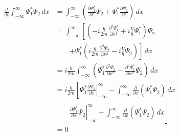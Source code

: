 \documentclass{article}
\begin{document}
\begin{align*}
  \frac{d}{d t} \int_{-\infty}^\infty \Psi_1^* \Psi_2 \,d x & = \int_{-\infty}^\infty \left( \frac{\partial \Psi_1^*}{\partial t} \Psi_2 + \Psi_1^* \frac{\partial \Psi_2}{\partial t} \right) \,d x                                                       \\
                                                            & = \int_{-\infty}^\infty \left[ \left( -i \frac{\hbar}{2 m} \frac{\partial^2 \Psi_1^*}{\partial x^2} + i \frac{V}{\hbar} \Psi_1^* \right) \Psi_2 \right.                                      \\
                                                            & \qquad \left. + \Psi_1^* \left( i \frac{\hbar}{2 m} \frac{\partial^2 \Psi_2}{\partial x^2} - i \frac{V}{\hbar} \Psi_2 \right) \right] \,d x                                                  \\
                                                            & = i \frac{\hbar}{2 m} \int_{-\infty}^\infty \left( \Psi_1^* \frac{\partial^2 \Psi_2}{\partial x^2} - \frac{\partial^2 \Psi_1^*}{\partial x^2} \Psi_2 \right) \,d x                           \\
                                                            & = i \frac{\hbar}{2 m} \left[ \left. \Psi_1^* \frac{\partial \Psi_2}{\partial x} \right|_{-\infty}^\infty - \int_{-\infty}^\infty \frac{\partial}{\partial x} (\Psi_1^* \Psi_2) \,d x \right. \\
                                                            & \qquad \left. \left. \frac{\partial \Psi_1^*}{\partial x} \Psi_2 \right|_{-\infty}^\infty - \int_{-\infty}^\infty \frac{\partial}{\partial x} (\Psi_1^* \Psi_2) \,d x \right]                \\
                                                            & = 0
\end{align*}

\subsection{}
\end{document}
